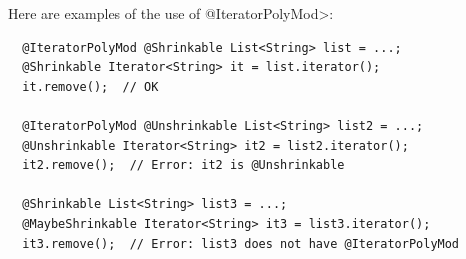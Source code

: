 Here are examples of the use of \<@IteratorPolyMod>:

\begin{Verbatim}
  @IteratorPolyMod @Shrinkable List<String> list = ...;
  @Shrinkable Iterator<String> it = list.iterator();
  it.remove();  // OK

  @IteratorPolyMod @Unshrinkable List<String> list2 = ...;
  @Unshrinkable Iterator<String> it2 = list2.iterator();
  it2.remove();  // Error: it2 is @Unshrinkable

  @Shrinkable List<String> list3 = ...;
  @MaybeShrinkable Iterator<String> it3 = list3.iterator();
  it3.remove();  // Error: list3 does not have @IteratorPolyMod
\end{Verbatim}


